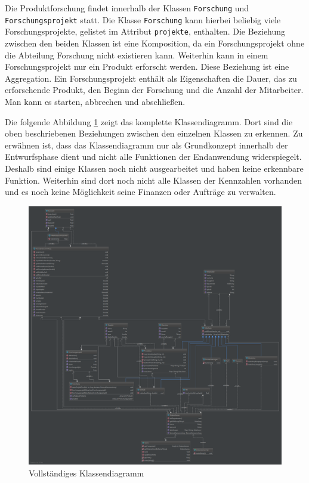 Die Produktforschung findet innerhalb der Klassen \texttt{Forschung} und \texttt{Forschungsprojekt} statt. 
Die Klasse \texttt{Forschung} kann hierbei beliebig viele Forschungsprojekte, gelistet im Attribut \texttt{projekte}, enthalten. Die Beziehung zwischen den beiden Klassen ist eine Komposition, da ein Forschungsprojekt ohne die Abteilung Forschung nicht existieren kann. Weiterhin kann in einem Forschungsprojekt nur ein Produkt erforscht werden. Diese Beziehung ist eine Aggregation. Ein Forschungsprojekt enthält als Eigenschaften die Dauer, das zu erforschende Produkt, den Beginn der Forschung und die Anzahl der Mitarbeiter. Man kann es starten, abbrechen und abschließen.

Die folgende Abbildung \ref{abb:klassendiagramm} zeigt das komplette Klassendiagramm. Dort sind die oben beschriebenen Beziehungen zwischen den einzelnen Klassen zu erkennen. Zu erwähnen ist, dass das Klassendiagramm nur als Grundkonzept innerhalb der Entwurfsphase dient und nicht alle Funktionen der Endanwendung widerspiegelt. Deshalb sind einige Klassen noch nicht ausgearbeitet und haben keine erkennbare Funktion. Weiterhin sind dort noch nicht alle Klassen der Kennzahlen vorhanden und es noch keine Möglichkeit seine Finanzen oder Aufträge zu verwalten.

\begin{figure}[h]
	\centering	\includegraphics[width=\textwidth]{img/programmentwurf/klassendiagramm}
	\captionsetup{format=hang}
	\caption{
		\label{abb:klassendiagramm}Vollständiges Klassendiagramm}
\end{figure}




